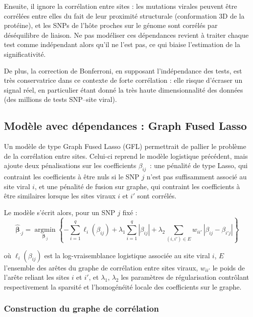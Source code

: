 \documentclass[11pt,a4paper]{article}
\begin{document}
Ensuite, il ignore la corrélation entre sites : les mutations virales peuvent
être corrélées entre elles du fait de leur proximité structurale
(conformation 3D de la protéine), et les SNPs de l'hôte proches sur le génome
sont corrélés par déséquilibre de liaison. Ne pas modéliser ces dépendances
revient à traiter chaque test comme indépendant alors qu'il ne l'est pas,
ce qui biaise l'estimation de la significativité.

De plus, la correction de Bonferroni, en supposant l'indépendance des tests,
est très conservatrice dans ce contexte de forte corrélation : elle risque
d'écraser un signal réel, en particulier étant donné la très haute
dimensionnalité des données (des millions de tests SNP--site viral).
  
\vspace{0.5cm}

\subsection{Modèle avec dépendances : Graph Fused Lasso}

Un modèle de type Graph Fused Lasso (GFL) \cite{GFLasso2022} permettrait de pallier le problème de la corrélation entre sites.
Celui-ci reprend le modèle logistique
précédent, mais ajoute deux pénalisations sur les coefficients
$\beta_{ij}$~: une pénalité de type Lasso, qui contraint les coefficients à
être nuls si le SNP $j$ n'est pas suffisamment associé au site viral $i$, et
une pénalité de fusion sur graphe, qui contraint les coefficients à être
similaires lorsque les sites viraux $i$ et $i'$ sont corrélés.

Le modèle s'écrit alors, pour un SNP $j$ fixé :
\[
\hat{\boldsymbol{\beta}}_{\cdot j} = \operatorname*{argmin}_{\boldsymbol{\beta}_{\cdot j}}
\left\{ -\sum_{i=1}^{q} \ell_i(\beta_{ij}) 
+ \lambda_1 \sum_{i=1}^{q} |\beta_{ij}|
+ \lambda_2 \sum_{(i,i') \in E} w_{ii'} \, |\beta_{ij} - \beta_{i'j}| \right\}
\]

où $\ell_i(\beta_{ij})$ est la log-vraisemblance logistique associée au site
viral $i$, $E$ l'ensemble des arêtes du graphe de corrélation entre sites
viraux, $w_{ii'}$ le poids de l'arête reliant les sites $i$ et $i'$, et
$\lambda_1$, $\lambda_2$ les paramètres de régularisation contrôlant
respectivement la sparsité et l'homogénéité locale des coefficients sur le
graphe.

\subsubsection{Construction du graphe de corrélation}
\end{document}
